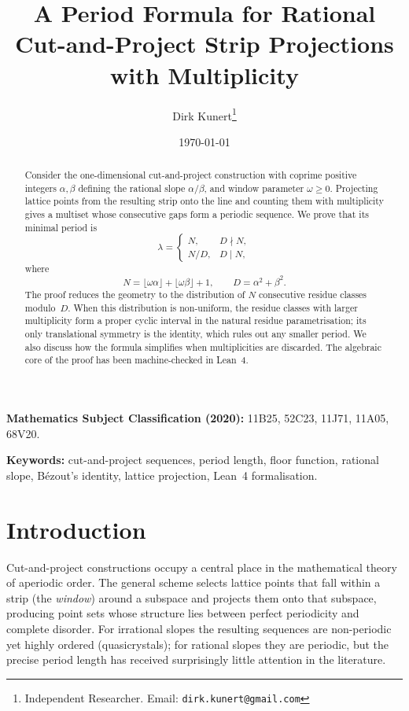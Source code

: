\documentclass[11pt]{article}
\title{A Period Formula for Rational\\ Cut-and-Project Strip Projections\\ with Multiplicity}
\author{
    Dirk Kunert\thanks{Independent Researcher. Email: \texttt{dirk.kunert@gmail.com}}
}
\date{\today}
\theoremstyle{plain}
\theoremstyle{definition}
\theoremstyle{remark}
\begin{document}
\maketitle

\begin{abstract}
Consider the one-dimensional cut-and-project construction with coprime
positive integers \(\alpha,\beta\) defining the rational slope
\(\alpha/\beta\), and window parameter \(\omega \ge 0\).  Projecting lattice
points from the resulting strip onto the line and counting them with
multiplicity gives a multiset whose consecutive gaps form a periodic
sequence.  We prove that its minimal period is
\[
\lambda =
\begin{cases}
N, & D\nmid N,\\
N/D, & D\mid N,
\end{cases}
\]
where
\[
N=\lfloor\omega\alpha\rfloor+\lfloor\omega\beta\rfloor+1,
\qquad
D=\alpha^2+\beta^2.
\]
The proof reduces the geometry to the distribution of \(N\) consecutive
residue classes modulo~\(D\).  When this distribution is non-uniform, the
residue classes with larger multiplicity form a proper cyclic interval in
the natural residue parametrisation; its only translational symmetry is the
identity, which rules out any smaller period.  We also discuss how the
formula simplifies when multiplicities are discarded.  The algebraic core of
the proof has been machine-checked in Lean~4.
\end{abstract}

\medskip
\noindent\textbf{Mathematics Subject Classification (2020):}
11B25, 52C23, 11J71, 11A05, 68V20.

\medskip
\noindent\textbf{Keywords:}
cut-and-project sequences, period length, floor function, rational slope,
B\'{e}zout's identity, lattice projection, Lean~4 formalisation.

\section{Introduction}\label{sec:intro}

Cut-and-project constructions occupy a central place in the mathematical
theory of aperiodic order.  The general scheme selects lattice points that
fall within a strip (the \emph{window}) around a subspace and projects them
onto that subspace, producing point sets whose structure lies between perfect
periodicity and complete disorder.  For irrational slopes the resulting
sequences are non-periodic yet highly ordered (quasicrystals); for rational
slopes they are periodic, but the precise period length has received
surprisingly little attention in the literature.
\end{document}
